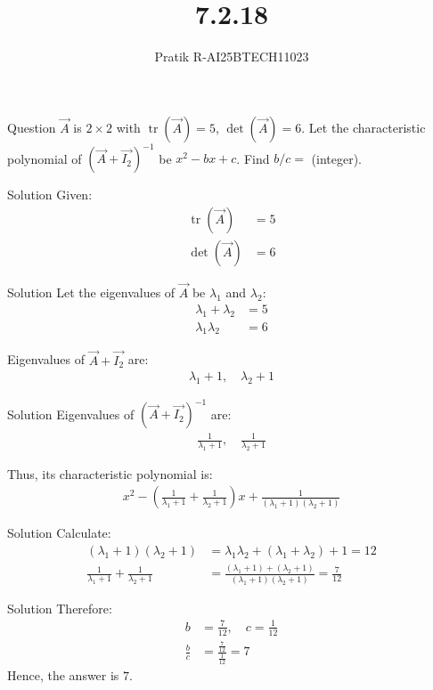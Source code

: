 \documentclass{beamer}
\title 
{7.2.18}
\author 
{Pratik R-AI25BTECH11023}
\begin{document}
\frame{\titlepage}
\begin{frame}{Question}
$\vec{A}$ is $2\times2$ with $\operatorname{tr}(\vec{A}) = 5$, $\det(\vec{A}) = 6$. Let the characteristic polynomial of $(\vec{A} + \vec{I_2})^{-1}$ be $x^2 - bx + c$. Find $b/c =$ (integer).
\end{frame}
\begin{frame}{Solution}
Given:
\begin{align}
\operatorname{tr}(\vec{A}) &= 5 \\
\det(\vec{A}) &= 6
\end{align}
\end{frame}
\begin{frame}{Solution}
Let the eigenvalues of $\vec{A}$ be $\lambda_1$ and $\lambda_2$:
\begin{align}
\lambda_1 + \lambda_2 &= 5 \\
\lambda_1 \lambda_2 &= 6
\end{align}

Eigenvalues of $\vec{A} + \vec{I_2}$ are:
\begin{align}
\lambda_1 + 1,\quad \lambda_2 + 1
\end{align}
\end{frame}
\begin{frame}{Solution}
Eigenvalues of $(\vec{A} + \vec{I_2})^{-1}$ are:
\begin{align}
\frac{1}{\lambda_1 + 1},\quad \frac{1}{\lambda_2 + 1}
\end{align}

Thus, its characteristic polynomial is:
\begin{align}
x^2 - \left(\frac{1}{\lambda_1 + 1} + \frac{1}{\lambda_2 + 1}\right)x + \frac{1}{(\lambda_1 + 1)(\lambda_2 + 1)}
\end{align}
\end{frame}
\begin{frame}{Solution}
Calculate:
\begin{align}
(\lambda_1+1)(\lambda_2+1) &= \lambda_1\lambda_2 + (\lambda_1+\lambda_2) + 1 = 12 \\
\frac{1}{\lambda_1+1} + \frac{1}{\lambda_2+1} &= \frac{(\lambda_1+1) + (\lambda_2+1)}{(\lambda_1+1)(\lambda_2+1)} = \frac{7}{12}
\end{align}
\end{frame}
\begin{frame}{Solution}
Therefore:
\begin{align}
b &= \frac{7}{12},\quad c = \frac{1}{12} \\
\frac{b}{c} &= \frac{\frac{7}{12}}{\frac{1}{12}} = 7
\end{align}
Hence, the answer is $7$.
\end{frame}
\end{document}
